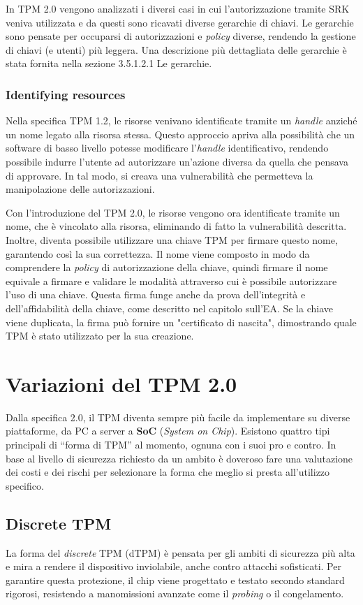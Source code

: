 In TPM 2.0 vengono analizzati i diversi casi in cui l’autorizzazione tramite SRK veniva utilizzata e da questi sono ricavati diverse gerarchie di chiavi. Le gerarchie sono pensate per occuparsi di autorizzazioni e \textit{policy} diverse, rendendo la gestione di chiavi (e utenti) più leggera. Una descrizione più dettagliata delle gerarchie è stata fornita nella sezione 3.5.1.2.1 Le gerarchie.

\subsubsection{Identifying resources}
Nella specifica TPM 1.2, le risorse venivano identificate tramite un \textit{handle} anziché un nome legato alla risorsa stessa. Questo approccio apriva alla possibilità che un software di basso livello potesse modificare l'\textit{handle} identificativo, rendendo possibile indurre l’utente ad autorizzare un'azione diversa da quella che pensava di approvare. In tal modo, si creava una vulnerabilità che permetteva la manipolazione delle autorizzazioni.

Con l'introduzione del TPM 2.0, le risorse vengono ora identificate tramite un nome, che è vincolato alla risorsa, eliminando di fatto la vulnerabilità descritta. Inoltre, diventa possibile utilizzare una chiave TPM per firmare questo nome, garantendo così la sua correttezza. Il nome viene composto in modo da comprendere la \textit{policy} di autorizzazione della chiave, quindi firmare il nome equivale a firmare e validare le modalità attraverso cui è possibile autorizzare l'uso di una chiave. Questa firma funge anche da prova dell'integrità e dell'affidabilità della chiave, come descritto nel capitolo sull’EA. Se la chiave viene duplicata, la firma può fornire un "certificato di nascita", dimostrando quale TPM è stato utilizzato per la sua creazione.

\section{Variazioni del TPM 2.0}
Dalla specifica 2.0, il TPM diventa sempre più facile da implementare su diverse piattaforme, da PC a server a \textbf{SoC} (\textit{System on Chip}). Esistono quattro tipi principali di “forma di TPM” al momento, ognuna con i suoi pro e contro. In base al livello di sicurezza richiesto da un ambito è doveroso fare una valutazione dei costi e dei rischi per selezionare la forma che meglio si presta all’utilizzo specifico.

\subsection{Discrete TPM}
La forma del \textit{discrete} TPM (dTPM) è pensata per gli ambiti di sicurezza più alta e mira a rendere il dispositivo inviolabile, anche contro attacchi sofisticati. Per garantire questa protezione, il chip viene progettato e testato secondo standard rigorosi, resistendo a manomissioni avanzate come il \textit{probing} o il congelamento.

